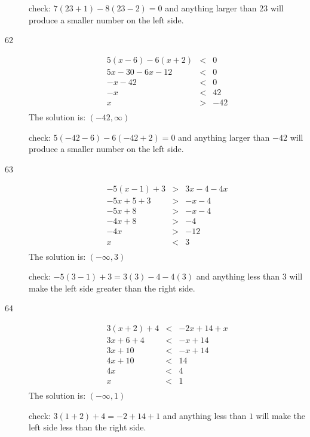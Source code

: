 \documentclass[letterpaper]{exam}
\begin{document}
\begin{description}
      check: \( 7(23 + 1) - 8(23 - 2) = 0 \) and anything larger than $23$ will produce a smaller number on
      the left side.

      \item[62]
      \begin{align*}
        5(x - 6) -6(x + 2) &<& 0 \\
        5x - 30 - 6x -12 &<& 0 \\
        -x - 42 &<& 0 \\
        -x &<& 42 \\
        x &>& -42 \\
      \end{align*}
      The solution is: \( (-42, \infty) \)

      check: \( 5(-42 - 6) -6(-42 + 2) = 0 \) and anything larger than $-42$ will produce a smaller number on
      the left side.

      \item[63]
      \begin{align*}
        -5(x - 1) + 3 &>& 3x - 4 -4x \\
        -5x + 5 + 3 &>& -x - 4 \\
        -5x + 8 &>& -x - 4 \\
        -4x + 8 &>& -4 \\
        -4x  &>& -12 \\
        x  &<& 3 \\
      \end{align*}
      The solution is: \( (-\infty, 3) \)

      check: \( -5(3 - 1) + 3 = 3(3) - 4 -4(3) \) and anything less than $3$ will make the left side greater than the right side.

      \item[64]
      \begin{align*}
        3(x + 2) + 4 &<& -2x + 14 + x \\
        3x + 6 + 4 &<& -x + 14 \\
        3x + 10 &<& -x + 14 \\
        4x + 10 &<& 14 \\
        4x &<& 4 \\
        x &<& 1 \\
      \end{align*}
      The solution is: \( (-\infty, 1) \)

      check: \( 3(1 + 2) + 4 = -2 + 14 + 1 \) and anything less than $1$ will make the left side less than the right side.


\end{description}
\end{document}
